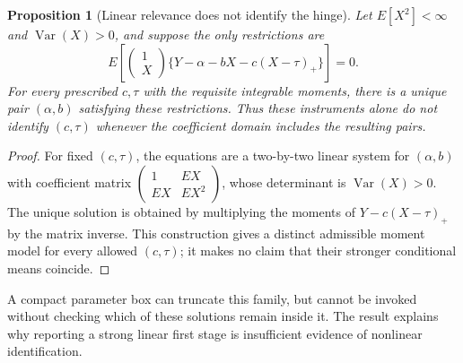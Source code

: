 \documentclass[11pt]{article}
\newtheorem{proposition}[theorem]{Proposition}
\theoremstyle{definition}
\begin{document}
\begin{proposition}[Linear relevance does not identify the hinge]
Let $E[X^2]<\infty$ and $\operatorname{Var}(X)>0$, and suppose the only restrictions are
\[
 E\left[\begin{pmatrix}1\\X\end{pmatrix}
 \{Y-\alpha-bX-c(X-\tau)_+\}\right]=0.
\]
For every prescribed $c,\tau$ with the requisite integrable moments, there is a unique pair $(\alpha,b)$ satisfying these restrictions. Thus these instruments alone do not identify $(c,\tau)$ whenever the coefficient domain includes the resulting pairs.
\end{proposition}
\begin{proof}
For fixed $(c,\tau)$, the equations are a two-by-two linear system for $(\alpha,b)$ with coefficient matrix
$\begin{pmatrix}1&E X\\E X&E X^2\end{pmatrix}$, whose determinant is $\operatorname{Var}(X)>0$. The unique solution is obtained by multiplying the moments of $Y-c(X-\tau)_+$ by the matrix inverse. This construction gives a distinct admissible moment model for every allowed $(c,\tau)$; it makes no claim that their stronger conditional means coincide.
\end{proof}
A compact parameter box can truncate this family, but cannot be invoked without checking which of these solutions remain inside it. The result explains why reporting a strong linear first stage is insufficient evidence of nonlinear identification.
\end{document}

